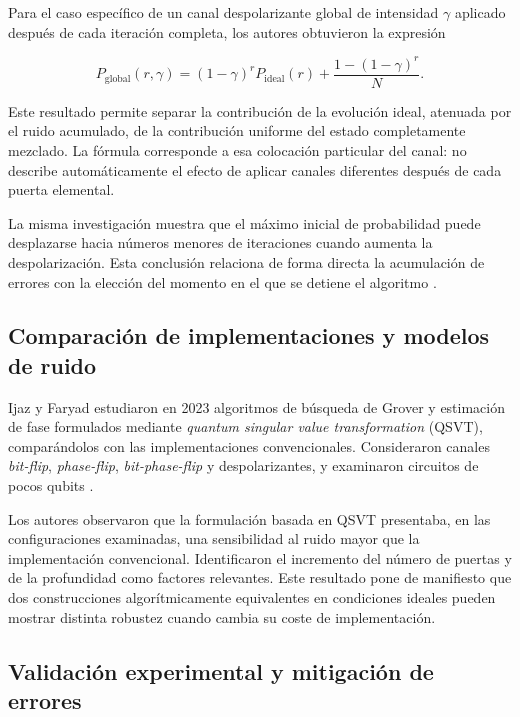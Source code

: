 \documentclass[11pt,a4paper]{article}
\begin{document}
Para el caso específico de un canal despolarizante global de intensidad $\gamma$ aplicado después de cada iteración completa, los autores obtuvieron la expresión

\begin{equation}
    P_{\mathrm{global}}(r,\gamma)=
    (1-\gamma)^r P_{\mathrm{ideal}}(r)
    +\frac{1-(1-\gamma)^r}{N}.
    \label{eq:global}
\end{equation}

Este resultado permite separar la contribución de la evolución ideal, atenuada por el ruido acumulado, de la contribución uniforme del estado completamente mezclado. La fórmula corresponde a esa colocación particular del canal: no describe automáticamente el efecto de aplicar canales diferentes después de cada puerta elemental.

La misma investigación muestra que el máximo inicial de probabilidad puede desplazarse hacia números menores de iteraciones cuando aumenta la despolarización. Esta conclusión relaciona de forma directa la acumulación de errores con la elección del momento en el que se detiene el algoritmo \cite{cohn2016}.

\subsection{Comparación de implementaciones y modelos de ruido}

Ijaz y Faryad estudiaron en 2023 algoritmos de búsqueda de Grover y estimación de fase formulados mediante \emph{quantum singular value transformation} (QSVT), comparándolos con las implementaciones convencionales. Consideraron canales \emph{bit-flip}, \emph{phase-flip}, \emph{bit-phase-flip} y despolarizantes, y examinaron circuitos de pocos qubits \cite{ijaz2023}.

Los autores observaron que la formulación basada en QSVT presentaba, en las configuraciones examinadas, una sensibilidad al ruido mayor que la implementación convencional. Identificaron el incremento del número de puertas y de la profundidad como factores relevantes. Este resultado pone de manifiesto que dos construcciones algorítmicamente equivalentes en condiciones ideales pueden mostrar distinta robustez cuando cambia su coste de implementación.

\subsection{Validación experimental y mitigación de errores}
\end{document}

